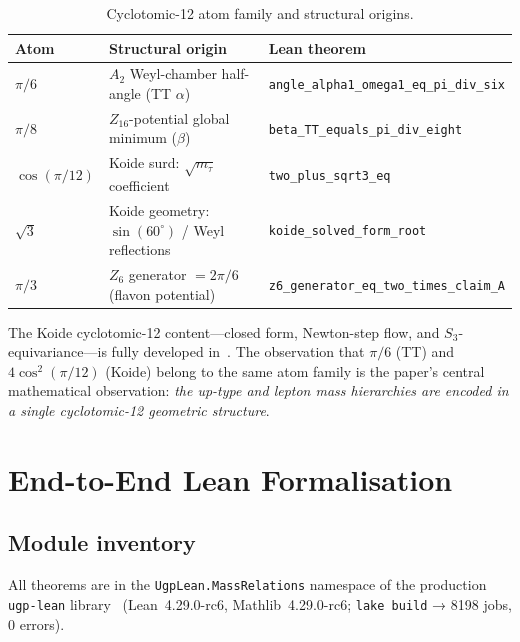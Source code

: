 \documentclass[11pt]{article}
\theoremstyle{remark}
\newcommand{\lean}[1]{\texttt{\small#1}}
\begin{document}
\begin{table}[ht]
\centering
\caption{Cyclotomic-12 atom family and structural origins.}
\label{tab:cyclo}
\small
\begin{tabular}{lll}
\toprule
Atom & Structural origin & Lean theorem \\
\midrule
$\pi/6$ & $A_2$ Weyl-chamber half-angle (TT $\alpha$) & \lean{angle\_alpha1\_omega1\_eq\_pi\_div\_six} \\
$\pi/8$ & $Z_{16}$-potential global minimum ($\beta$) & \lean{beta\_TT\_equals\_pi\_div\_eight} \\
$\cos(\pi/12)$ & Koide surd: $\sqrt{m_\tau}$ coefficient & \lean{two\_plus\_sqrt3\_eq} \\
$\sqrt{3}$ & Koide geometry: $\sin(60^\circ)$ / Weyl reflections & \lean{koide\_solved\_form\_root} \\
$\pi/3$ & $Z_6$ generator $= 2\pi/6$ (flavon potential) & \lean{z6\_generator\_eq\_two\_times\_claim\_A} \\
\bottomrule
\end{tabular}
\end{table}

The Koide cyclotomic-12 content---closed form, Newton-step flow, and
$S_3$-equivariance---is fully developed in~\cite{Spivack2026_Koide}.
The observation that $\pi/6$ (TT) and $4\cos^2(\pi/12)$ (Koide) belong to
the same atom family is the paper's central mathematical observation:
\emph{the up-type and lepton mass hierarchies are encoded in a single
cyclotomic-12 geometric structure}.

\section{End-to-End Lean Formalisation}
\label{sec:lean}

\subsection{Module inventory}

All theorems are in the \texttt{UgpLean.MassRelations} namespace of the
production \texttt{ugp-lean} library~\cite{ugp-lean}
(Lean~4.29.0-rc6, Mathlib~4.29.0-rc6; \texttt{lake build} → 8198 jobs,
0 errors).
\end{document}
